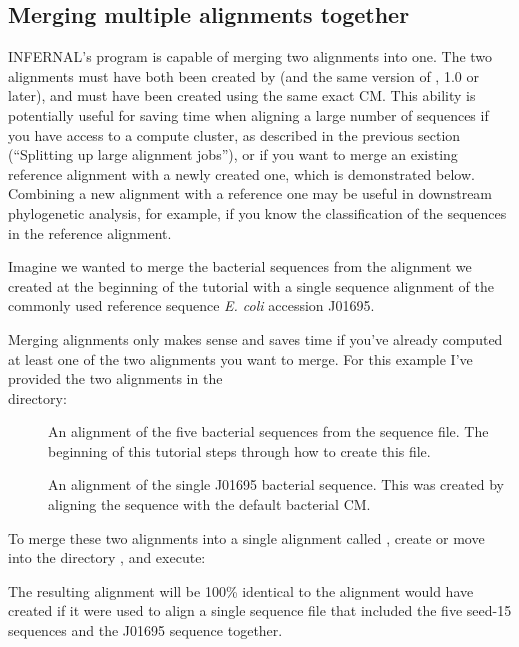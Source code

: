 \subsection{Merging multiple alignments together}

INFERNAL's  program is capable of merging
two alignments into one. The two alignments must have both been
created by  (and the same version of , 1.0
or later), and must have been created using the same exact CM. This
ability is potentially useful for saving time when aligning a large
number of sequences if you have access to a compute cluster, as
described in the previous section (``Splitting up large alignment
jobs''), or if you want to merge an existing reference alignment with
a newly created one, which is demonstrated below. Combining a new
alignment with a reference one may be useful in downstream
phylogenetic analysis, for example, if you know the classification of
the sequences in the reference alignment.

Imagine we wanted to merge the bacterial sequences from the 
 alignment we created at the beginning of the tutorial
with a single sequence alignment of the commonly used reference
sequence \emph{E. coli}  accession J01695. 

Merging alignments only makes sense and saves time if you've already
computed at least one of the two alignments you want to merge. For
this example I've provided the two alignments in the \\
 directory:

\begin{description}
\item[]
  An alignment of the five bacterial sequences from the 
  sequence file. The beginning of this tutorial steps through how to create this file.

\item[]
  An alignment of the single J01695 bacterial sequence. This was
  created by aligning the sequence with the default bacterial CM.
\end{description}

To merge these two alignments into a single alignment called
, create or move
into the directory , and
execute: 


The resulting alignment will be 100\% identical to the alignment
 would have created if it were used to align a single
sequence file that included the five seed-15 sequences and the J01695
sequence together.


